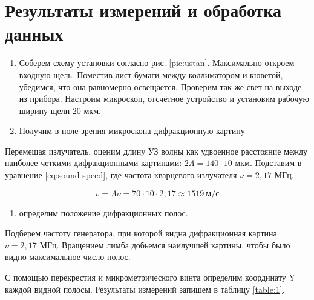 \documentclass[a4paper,12pt]{article}
\begin{document}
\section{Результаты измерений и обработка данных}

\begin{enumerate}
    \item Соберем схему установки согласно рис. \ref{pic:ustan}. Максимально откроем входную щель. Поместив лист бумаги между коллиматором и кюветой, убедимся, что она равномерно освещается. Проверим так же свет на выходе из прибора. Настроим микроскоп, отсчётное устройство и установим рабочую ширину щели 20 мкм.
    \item Получим в поле зрения микроскопа дифракционную картину
\end{enumerate}

Перемещая излучатель, оценим длину УЗ волны как удвоенное расстояние между наиболее четкими дифракционными картинами: $2 \Lambda = 140 \cdot 10$ мкм. Подставим в уравнение \eqref{eq:sound-speed}, где частота кварцевого излучателя $\nu = 2,17$ МГц.

\begin{equation*}
    v = \Lambda \nu = 70 \cdot 10 \cdot 2,17 \approx 1519 \ \text{м/с}
\end{equation*}

\begin{enumerate}[resume]
    \item определим положение дифракционных полос.
\end{enumerate}

Подберем частоту генератора, при которой видна дифракционная картина $\nu = 2,17$ МГц. Вращением лимба добьемся наилучшей картины, чтобы было видно максимальное число полос.

С помощью перекрестия и микрометрического винта определим координату Y каждой видной полосы. Результаты измерений запишем в таблицу \ref{table:1}.
\end{document}
